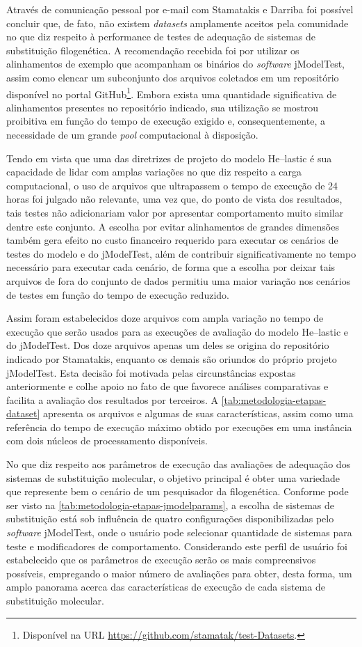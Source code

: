 \documentclass[english,brazilian]{UNISINOSmonografia} %
\begin{document}
Através de comunicação pessoal por e-mail com Stamatakis e Darriba foi possível concluir que, de fato, não existem \textit{datasets} amplamente aceitos pela comunidade no que diz respeito à performance de testes de adequação de sistemas de substituição filogenética.
A recomendação recebida foi por utilizar os alinhamentos de exemplo que acompanham os binários do \textit{software} jModelTest, assim como elencar um subconjunto dos arquivos coletados em um repositório disponível no portal GitHub\footnote{
	Disponível na URL \url{https://github.com/stamatak/test-Datasets}.
}.
Embora exista uma quantidade significativa de alinhamentos presentes no repositório indicado, sua utilização se mostrou proibitiva em função do tempo de execução exigido e, consequentemente, a necessidade de um grande \textit{pool} computacional à disposição.


Tendo em vista que uma das diretrizes de projeto do modelo \textsf{He}--lastic é sua capacidade de lidar com amplas variações no que diz respeito a carga computacional, o uso de arquivos que ultrapassem o tempo de execução de 24 horas foi julgado não relevante, uma vez que, do ponto de vista dos resultados, tais testes não adicionariam valor por apresentar comportamento muito similar dentre este conjunto.
A escolha por evitar alinhamentos de grandes dimensões também gera efeito no custo financeiro requerido para executar os cenários de testes do modelo e do jModelTest, além de contribuir significativamente no tempo necessário para executar cada cenário, de forma que a escolha por deixar tais arquivos de fora do conjunto de dados permitiu uma maior variação nos cenários de testes em função do tempo de execução reduzido.


Assim foram estabelecidos doze arquivos com ampla variação no tempo de execução que serão usados para as execuções de avaliação do modelo \textsf{He}--lastic e do jModelTest.
Dos doze arquivos apenas um deles se origina do repositório indicado por Stamatakis, enquanto os demais são oriundos do próprio projeto jModelTest.
Esta decisão foi motivada pelas circunstâncias expostas anteriormente e colhe apoio no fato de que favorece análises comparativas e facilita a avaliação dos resultados por terceiros.
A \autoref{tab:metodologia-etapas-dataset} apresenta os arquivos e algumas de suas características, assim como uma referência do tempo de execução máximo obtido por execuções em uma instância com dois núcleos de processamento disponíveis.


No que diz respeito aos parâmetros de execução das avaliações de adequação dos sistemas de substituição molecular, o objetivo principal é obter uma variedade que represente bem o cenário de um pesquisador da filogenética.
Conforme pode ser visto na \autoref{tab:metodologia-etapas-jmodelparams}, a escolha de sistemas de substituição está sob influência de quatro configurações disponibilizadas pelo \textit{software} jModelTest, onde o usuário pode selecionar quantidade de sistemas para teste e modificadores de comportamento.
Considerando este perfil de usuário foi estabelecido que os parâmetros de execução serão os mais compreensivos possíveis, empregando o maior número de avaliações para obter, desta forma, um amplo panorama acerca das características de execução de cada sistema de substituição molecular.
\end{document}
